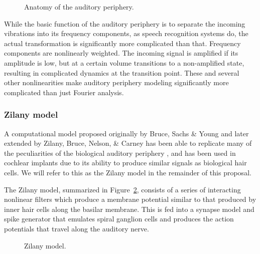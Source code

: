 \documentclass{article}
\begin{document}
\begin{figure}
  \begin{center}
  \end{center}
  \caption{Anatomy of the auditory periphery.}
  \label{fig:anatomy}
\end{figure}

While the basic function of the auditory periphery
is to separate the incoming vibrations
into its frequency components,
as speech recognition systems do,
the actual transformation is significantly
more complicated than that.
Frequency components are nonlinearly weighted.
The incoming signal is amplified
if its amplitude is low,
but at a certain volume transitions
to a non-amplified state,
resulting in complicated dynamics
at the transition point.
These and several other nonlinearities
make auditory periphery modeling
significantly more complicated
than just Fourier analysis.

\subsubsection{Zilany model} \label{subsec:zilany}

A computational model proposed originally by
Bruce, Sachs \& Young
and later extended by Zilany, Bruce, Nelson, \& Carney
has been able to replicate
many of the peculiarities
of the biological auditory periphery
\citep{bruce2003,zilany2006,zilany2007,zilany2009,zilany2014},
and has been used in cochlear implants
due to its ability to produce
similar signals as biological hair cells.
We will refer to this as the
Zilany model in the remainder of this proposal.

The Zilany model,
summarized in Figure~\ref{fig:zilany},
consists of a series
of interacting nonlinear filters
which produce a membrane potential
similar to that produced
by inner hair cells along the basilar membrane.
This is fed into a synapse model and spike generator
that emulates spiral ganglion cells
and produces the action potentials
that travel along the auditory nerve.

\begin{figure}
  \begin{center}
  \end{center}
  \caption{Zilany model.}
  \label{fig:zilany}
\end{figure}
\end{document}
